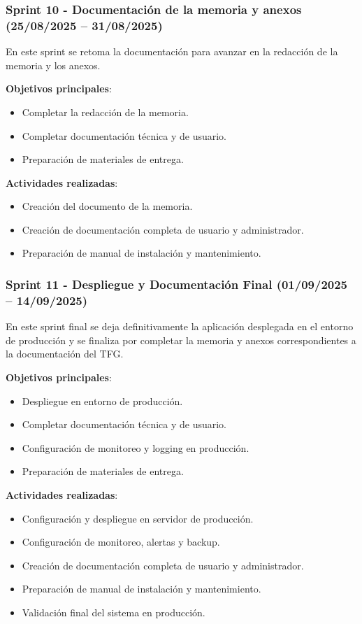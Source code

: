 \subsubsection{Sprint 10 - Documentación de la memoria y anexos (25/08/2025 – 31/08/2025)} 
En este sprint se retoma la documentación para avanzar en la redacción de la memoria y los anexos.

\textbf{Objetivos principales}:
\begin{itemize}
\tightlist
\item
Completar la redacción de la memoria.
\item
Completar documentación técnica y de usuario.
\item
Preparación de materiales de entrega.
\end{itemize}

\textbf{Actividades realizadas}:
\begin{itemize}
\tightlist
\item
Creación del documento de la memoria.
\item
Creación de documentación completa de usuario y administrador.
\item
Preparación de manual de instalación y mantenimiento.
\end{itemize}

\subsubsection{Sprint 11 - Despliegue y Documentación Final (01/09/2025 – 14/09/2025)} 
En este sprint final se deja definitivamente la aplicación desplegada en el entorno de producción y se finaliza por completar la memoria y anexos correspondientes a la documentación del TFG.

\textbf{Objetivos principales}:
\begin{itemize}
\tightlist
\item
Despliegue en entorno de producción.
\item
Completar documentación técnica y de usuario.
\item
Configuración de monitoreo y logging en producción.
\item
Preparación de materiales de entrega.
\end{itemize}

\textbf{Actividades realizadas}:
\begin{itemize}
\tightlist
\item
Configuración y despliegue en servidor de producción.
\item
Configuración de monitoreo, alertas y backup.
\item
Creación de documentación completa de usuario y administrador.
\item
Preparación de manual de instalación y mantenimiento.
\item
Validación final del sistema en producción.
\end{itemize}

